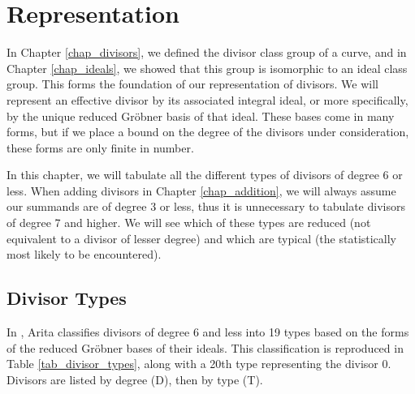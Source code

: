 
\section{Representation}
\label{chap_representation}

In Chapter \ref{chap_divisors}, we defined the divisor class group of a curve,
and in Chapter \ref{chap_ideals}, we showed that this group is isomorphic to an ideal class group.
This forms the foundation of our representation of divisors.
We will represent an effective divisor by its associated integral ideal,
or more specifically, by the unique reduced Gr\"obner basis of that ideal.
These bases come in many forms, but if we place a bound on the degree of the divisors under consideration,
these forms are only finite in number.

In this chapter, we will tabulate all the different types of divisors of degree 6 or less.
When adding divisors in Chapter \ref{chap_addition},
we will always assume our summands are of degree 3 or less,
thus it is unnecessary to tabulate divisors of degree 7 and higher.
We will see which of these types are reduced (not equivalent to a divisor of lesser degree)
and which are typical (the statistically most likely to be encountered).




\subsection{Divisor Types}

In \cite{arita05-2}, Arita classifies divisors of degree 6 and less into 19 types
based on the forms of the reduced Gr\"obner bases of their ideals.
This classification is reproduced in Table \ref{tab_divisor_types},
along with a 20th type representing the divisor 0.
Divisors are listed by degree (D), then by type (T).

